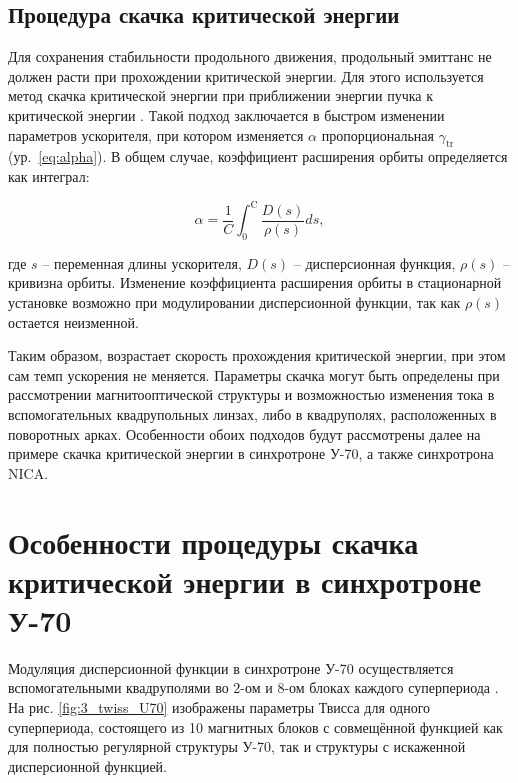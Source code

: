 \newpage
\subsection{Процедура скачка критической энергии}

\par Для сохранения стабильности продольного движения, продольный эмиттанс не должен расти при прохождении критической энергии. Для этого используется метод скачка критической энергии при приближении энергии пучка к критической энергии \cite{risselada:jump}. Такой подход заключается в быстром изменении параметров ускорителя, при котором изменяется $\alpha$ пропорциональная $\gamma_{\textrm{tr}}$ (ур.~\ref{eq:alpha}). В общем случае, коэффициент расширения орбиты определяется как интеграл:

\begin{equation}
\alpha=\frac{1}{C} \int_0^{\mathrm{C}} \frac{D(s)}{\rho(s)} d s,
\label{eq:alpha_general}
\end{equation}

\noindent где $s$ -- переменная длины ускорителя, $D\left(s\right)$ -- дисперсионная функция, $\rho\left(s\right)$ -- кривизна орбиты. Изменение коэффициента расширения орбиты в стационарной установке возможно при модулировании дисперсионной функции, так как $\rho\left(s\right)$ остается неизменной. 

\par Таким образом, возрастает скорость прохождения критической энергии, при этом сам темп ускорения не меняется. Параметры скачка могут быть определены при рассмотрении магнитооптической структуры и возможностью изменения тока в вспомогательных квадрупольных линзах, либо в квадруполях, расположенных в поворотных арках. Особенности обоих подходов будут рассмотрены далее на примере скачка критической энергии в синхротроне У-70, а также синхротрона NICA.

\section{Особенности процедуры скачка критической энергии в синхротроне У-70}

\par Модуляция дисперсионной функции в синхротроне У-70 осуществляется вспомогательными квадруполями во $2$-ом и $8$-ом блоках каждого суперпериода \cite{cherniy:ihep}. На рис. \ref{fig:3_twiss_U70} изображены параметры Твисса для одного суперпериода, состоящего из 10 магнитных блоков с совмещённой функцией как для полностью регулярной структуры У-70, так и структуры с искаженной дисперсионной функцией.

